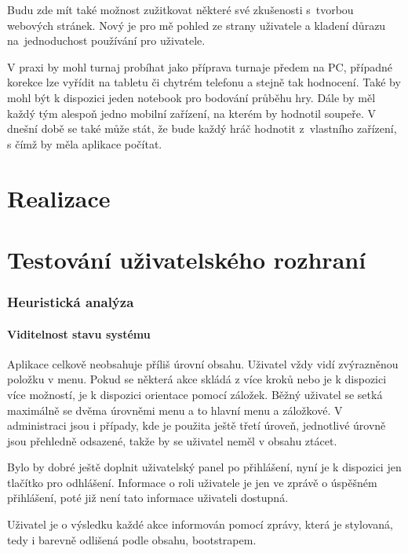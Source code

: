 \documentclass[thesis=B,czech]{FITthesis}[2012/06/26]
\begin{document}
	Budu zde mít také možnost zužitkovat některé své zkušenosti s~tvorbou webových stránek. Nový je pro mě pohled ze strany uživatele a kladení důrazu na~jednoduchost používání pro uživatele.
	
	V praxi by mohl turnaj probíhat jako příprava turnaje předem na PC, případné korekce lze vyřídit na tabletu či chytrém telefonu a stejně tak hodnocení. Také by mohl být k dispozici jeden notebook pro bodování průběhu hry. Dále by měl každý tým alespoň jedno mobilní zařízení, na kterém by hodnotil soupeře. V dnešní době se také může stát, že bude každý hráč hodnotit z~vlastního zařízení, s čímž by měla aplikace počítat.


\chapter{Realizace}


\chapter{Testování uživatelského rozhraní}
	
	\subsection{Heuristická analýza}

	\subsubsection{Viditelnost stavu systému}
	Aplikace celkově neobsahuje příliš úrovní obsahu. Uživatel vždy vidí zvýrazněnou položku v menu. Pokud se některá akce skládá z více kroků nebo je k dispozici více možností, je k dispozici orientace pomocí záložek. Běžný uživatel se setká maximálně se dvěma úrovněmi menu a to hlavní menu a záložkové. V administraci jsou i případy, kde je použita ještě třetí úroveň, jednotlivé úrovně jsou přehledně odsazené, takže by se uživatel neměl v obsahu ztácet.

	Bylo by dobré ještě doplnit uživatelský panel po přihlášení, nyní je k dispozici jen tlačítko pro odhlášení. Informace o roli uživatele je jen ve zprávě o úspěšném přihlášení, poté již není tato informace uživateli dostupná.

	Uživatel je o výsledku každé akce informován pomocí zprávy, která je stylovaná, tedy i barevně odlišená podle obsahu, bootstrapem.
\end{document}

